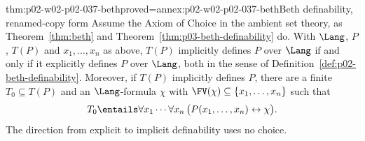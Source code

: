 \begin{hbcorollary}{thm:p02-w02-p02-037-beth}{proved=annex:p02-w02-p02-037-beth}{Beth definability, renamed-copy form}
Assume the Axiom of Choice in the ambient set theory, as
Theorem~\ref{thm:beth} and Theorem~\ref{thm:p03-beth-definability} do.
With \(\Lang\), \(P\), \(T(P)\) and \(x_1,\ldots,x_n\) as above,
\(T(P)\) implicitly defines \(P\) over \(\Lang\) if and only if it
explicitly defines \(P\) over \(\Lang\), both in the sense of
Definition~\ref{def:p02-beth-definability}.  Moreover, if \(T(P)\)
implicitly defines \(P\), there are a finite \(T_0\subseteq T(P)\) and an
\(\Lang\)-formula \(\chi\) with \(\FV(\chi)\subseteq\{x_1,\ldots,x_n\}\)
such that
\[
 T_0\entails\forall x_1\cdots\forall x_n\,
 \bigl(P(x_1,\ldots,x_n)\leftrightarrow\chi\bigr).
\]
The direction from explicit to implicit definability uses no choice.
\end{hbcorollary}

